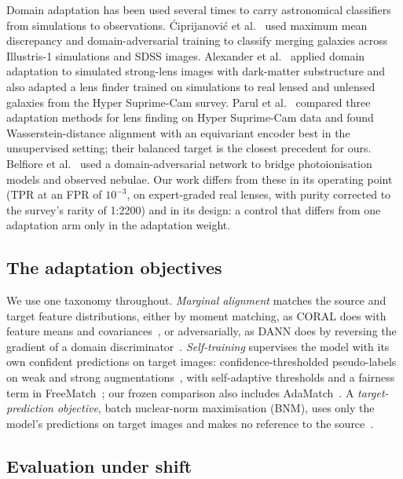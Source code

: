 Domain adaptation has been used several times to carry astronomical classifiers from
simulations to observations. \'Ciprijanovi\'c et al.~\citep{ciprijanovic2021} used maximum
mean discrepancy and domain-adversarial training to classify merging galaxies across
Illustris-1 simulations and SDSS images. Alexander et al.~\citep{alexander2023} applied domain
adaptation to simulated strong-lens images with dark-matter substructure and also adapted a
lens finder trained on simulations to real lensed and unlensed galaxies from the Hyper
Suprime-Cam survey. Parul et al.~\citep{parul2024} compared three adaptation methods for lens
finding on Hyper Suprime-Cam data and found Wasserstein-distance alignment with an equivariant
encoder best in the unsupervised setting; their balanced target is the closest precedent for
ours. Belfiore et al.~\citep{belfiore2024} used a domain-adversarial network to bridge
photoionisation models and observed nebulae. Our work differs from these in its operating
point (TPR at an FPR of $10^{-3}$, on expert-graded real lenses, with purity corrected to the survey's rarity
of 1:2200) and in
its design: a control that differs from one adaptation arm only in the adaptation weight.

\subsection{The adaptation objectives}

We use one taxonomy throughout. \emph{Marginal alignment} matches the source and target
feature distributions, either by moment matching, as CORAL does with feature means and
covariances~\citep{sun2016coral, gulrajani2021domainbed}, or adversarially, as DANN does by
reversing the gradient of a domain discriminator~\citep{ganin2016dann}. \emph{Self-training}
supervises the model with its own confident predictions on target images:
confidence-thresholded pseudo-labels on weak and strong augmentations~\citep{sohn2020fixmatch},
with self-adaptive thresholds and a fairness term in FreeMatch~\citep{wang2022freematch}; our
frozen comparison also includes AdaMatch~\citep{berthelot2022adamatch}. A
\emph{target-prediction objective}, batch nuclear-norm maximisation (BNM), uses only the
model's predictions on target images and makes no reference to the
source~\citep{cui2020bnm}.

\subsection{Evaluation under shift}

